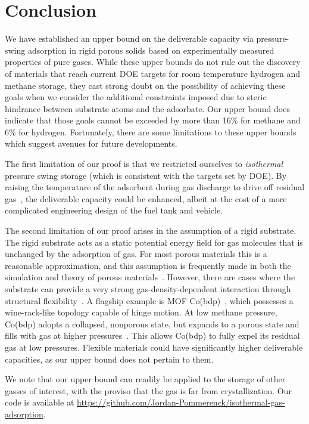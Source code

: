 \section{Conclusion}
We have established an upper bound on the deliverable capacity via
pressure-swing adsorption in rigid porous solids based on experimentally
measured properties of pure gases. While these upper bounds do not rule out the
discovery of materials that reach current DOE targets for room temperature hydrogen and methane storage, they cast strong doubt
on the possibility of achieving these goals when we consider the additional
constraints imposed due to steric hindrance between substrate atoms and the
adsorbate. Our upper bound does indicate that those goals cannot be exceeded by
more than 16\% for methane and 6\% for hydrogen. Fortunately, there are some
limitations to these upper bounds which suggest avenues for future developments.

The first limitation of our proof is that we restricted ourselves to
\emph{isothermal} pressure swing storage (which is consistent with the targets set by DOE). By raising the temperature of the
adsorbent during gas discharge to drive off residual
gas~\cite{gomez2014exploring}, the deliverable capacity could be enhanced,
albeit at the cost of a more complicated engineering design of the fuel tank
and vehicle.

The second limitation of our proof arises in the assumption of a rigid
substrate. The rigid substrate acts as a static potential energy field for gas
molecules that is unchanged by the adsorption of gas. For most porous materials
this is a reasonable approximation, and this assumption is frequently made in
both the simulation and theory of porous materials~\cite{duren2009using}.
However, there are cases where the substrate can provide a very strong
gas-density-dependent interaction through structural
flexibility~\cite{schneemann2014flexible}. A flagship example is MOF
Co(bdp)~\cite{choi2008broadly}, which possesses a wine-rack-like topology
capable of hinge motion. At low methane pressure, Co(bdp) adopts a collapsed,
nonporous state, but expands to a porous state and fills with gas at higher
pressures~\cite{mason2015methane}. This allows Co(bdp) to fully expel its
residual gas at low pressures. Flexible materials could have significantly 
higher deliverable capacities, as our upper bound does not pertain to them.

We note that our upper bound can readily be applied to the storage of other
gasses of interest, with the proviso that the gas is far from crystallization.
Our code is available at \href{https://github.com/Jordan-Pommerenck/isothermal-gas-adsorption}{https://github.com/Jordan-Pommerenck/isothermal-gas-adsorption}.